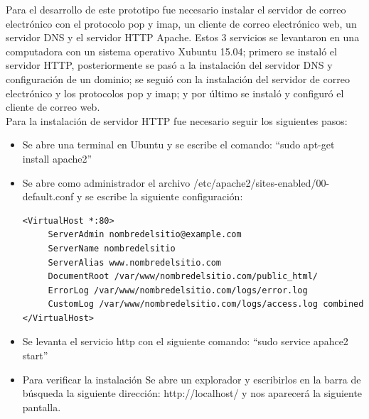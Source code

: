 \documentclass[12pt,oneside,onecolumn,openany]{report}
\begin{document}
Para el desarrollo de este prototipo fue necesario instalar el servidor de correo electrónico con el protocolo pop y imap, un cliente de correo electrónico web, un servidor DNS y el servidor HTTP Apache. Estos 3 servicios se levantaron en una computadora con un sistema operativo Xubuntu 15.04; primero se instaló el servidor HTTP\cite{HTTP}, posteriormente se pasó a la instalación del servidor DNS y configuración de un dominio\cite{DNS}; se seguió con la instalación del servidor de correo electrónico y los protocolos pop y imap; y por último se instaló y  configuró el cliente de correo web\cite{web}.\\
Para la instalación de servidor HTTP fue necesario seguir los siguientes pasos:\
\begin{itemize}
 \item Se abre una terminal en Ubuntu y se escribe el comando: “sudo apt-get install apache2”
 \item Se abre como administrador el archivo /etc/apache2/sites-enabled/00-default.conf y se escribe la siguiente configuración:
 \begin{lstlisting}[frame=single]
  <VirtualHost *:80>
     ServerAdmin nombredelsitio@example.com
     ServerName nombredelsitio
     ServerAlias www.nombredelsitio.com
     DocumentRoot /var/www/nombredelsitio.com/public_html/
     ErrorLog /var/www/nombredelsitio.com/logs/error.log
     CustomLog /var/www/nombredelsitio.com/logs/access.log combined
</VirtualHost>
 \end{lstlisting}
 \item Se levanta el servicio http con el siguiente comando: “sudo service apahce2 start”
 \item Para verificar la instalación Se abre un explorador y escribirlos en la barra de búsqueda la siguiente dirección: http://localhost/ y nos aparecerá la siguiente pantalla.
\end{itemize}
\end{document}
